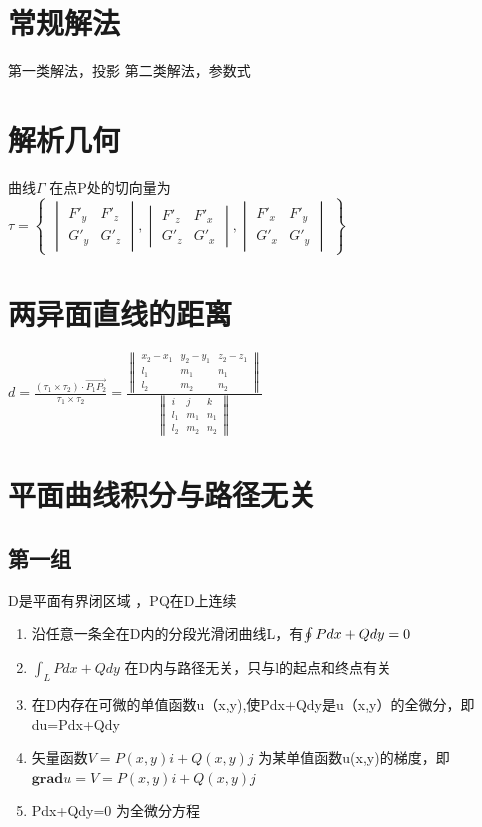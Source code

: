 \documentclass[UTF8]{ctexart}
\begin{document}
\section{常规解法}
第一类解法，投影
第二类解法，参数式

\section{解析几何}
曲线$\Gamma $ 在点P处的切向量为
$ \tau =
\begin{Bmatrix}

\begin{vmatrix}
F'_y & F'_z \\
G'_y & G'_z
\end{vmatrix}
,
\begin{vmatrix}
F'_z & F'_x \\
G'_z & G'_x
\end{vmatrix}
,
\begin{vmatrix}
F'_x & F'_y \\
G'_x & G'_y
\end{vmatrix}
\end{Bmatrix}
$

\section{两异面直线的距离}
$ d= \frac{ (\tau_1 \times \tau_2)\cdot \overrightarrow{P_1 P_2}}{\tau_1 \times \tau_2} = \frac{\begin{Vmatrix}
x_2-x_1 & y_2-y_1 & z_2-z_1 \\
l_1 & m_1 & n_1 \\
l_2 & m_2 & n_2
\end{Vmatrix}}{\begin{Vmatrix}
  i & j & k \\
  l_1 & m_1 & n_1 \\
  l_2 & m_2 & n_2
\end{Vmatrix}}
$

\section{平面曲线积分与路径无关}
\subsection{第一组}
D是平面有界闭区域 ，PQ在D上连续
\begin{enumerate}
  \item 沿任意一条全在D内的分段光滑闭曲线L，有$\ointop P dx + Q dy =0$
  \item $\int_L Pdx+Qdy $ 在D内与路径无关，只与l的起点和终点有关
  \item 在D内存在可微的单值函数u（x,y),使Pdx+Qdy是u（x,y）的全微分，即du=Pdx+Qdy
  \item 矢量函数$V=P(x,y)\mathit{i}+Q(x,y)\mathit{j}$ 为某单值函数u(x,y)的梯度，即 $\mathbf{grad}u=V=P(x,y)\mathit{i}+Q(x,y)\mathit{j}$
  \item Pdx+Qdy=0 为全微分方程
\end{enumerate}
\end{document}
